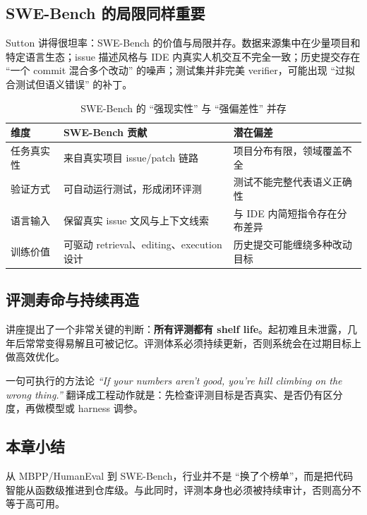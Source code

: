 \subsection{SWE-Bench 的局限同样重要}
Sutton 讲得很坦率：SWE-Bench 的价值与局限并存。数据来源集中在少量项目和特定语言生态；issue 描述风格与 IDE 内真实人机交互不完全一致；历史提交存在 ``一个 commit 混合多个改动'' 的噪声；测试集并非完美 verifier，可能出现 ``过拟合测试但语义错误'' 的补丁。

\begin{table}[H]
\centering
\begin{tabular}{p{3.4cm}p{5.0cm}p{5.0cm}}
\toprule
\textbf{维度} & \textbf{SWE-Bench 贡献} & \textbf{潜在偏差} \\
\midrule
任务真实性 & 来自真实项目 issue/patch 链路 & 项目分布有限，领域覆盖不全 \\
验证方式 & 可自动运行测试，形成闭环评测 & 测试不能完整代表语义正确性 \\
语言输入 & 保留真实 issue 文风与上下文线索 & 与 IDE 内简短指令存在分布差异 \\
训练价值 & 可驱动 retrieval、editing、execution 设计 & 历史提交可能缠绕多种改动目标 \\
\bottomrule
\end{tabular}
\caption{SWE-Bench 的 ``强现实性'' 与 ``强偏差性'' 并存}
\end{table}

\subsection{评测寿命与持续再造}
讲座提出了一个非常关键的判断：\textbf{所有评测都有 shelf life}。起初难且未泄露，几年后常常变得易解且可被记忆。评测体系必须持续更新，否则系统会在过期目标上做高效优化。

\begin{importantbox}{一句可执行的方法论}
\textit{``If your numbers aren't good, you're hill climbing on the wrong thing.''}  
翻译成工程动作就是：先检查评测目标是否真实、是否仍有区分度，再做模型或 harness 调参。
\end{importantbox}

\subsection{本章小结}
从 MBPP/HumanEval 到 SWE-Bench，行业并不是 ``换了个榜单''，而是把代码智能从函数级推进到仓库级。与此同时，评测本身也必须被持续审计，否则高分不等于高可用。

